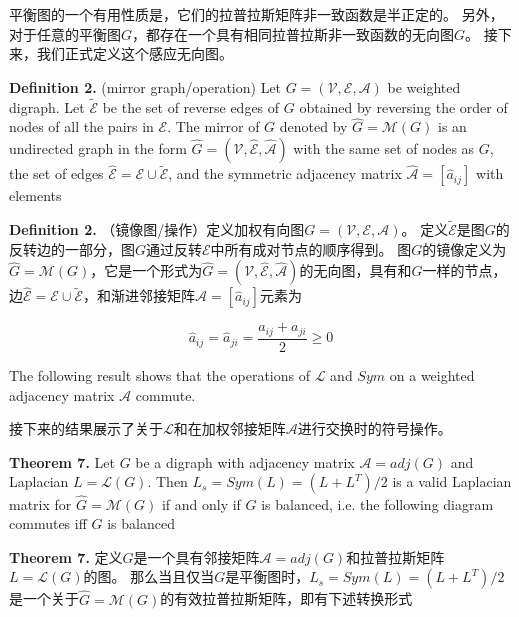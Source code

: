 \documentclass{article}
\begin{document}
平衡图的一个有用性质是，它们的拉普拉斯矩阵非一致函数是半正定的。
另外，对于任意的平衡图$G$，都存在一个具有相同拉普拉斯非一致函数的无向图$G$。
接下来，我们正式定义这个感应无向图。

{\color[gray]{0.5}
\noindent \textbf{Definition 2.} (mirror graph/operation) Let $G=(\mathcal{V}, \mathcal{E}, \mathcal{A})$ be weighted digraph. 
Let $\tilde{\mathcal{E}}$ be the set of reverse edges of $G$ obtained by reversing the order of nodes of all the pairs in $\mathcal{E}$. 
The mirror of $G$ denoted by $\hat{G}=\mathcal{M}(G)$ is an undirected graph in the form $\hat{G}=(\mathcal{V}, \hat{\mathcal{E}}, \hat{\mathcal{A}})$ with the same set of nodes as $G$, the set of edges $\hat{\mathcal{E}}=\mathcal{E}\cup \tilde{\mathcal{E}}$, and the symmetric adjacency matrix $\hat{\mathcal{A}}=[\hat{a}_{ij}]$ with elements
}

\noindent \textbf{Definition 2.} （镜像图/操作）定义加权有向图$G=(\mathcal{V}, \mathcal{E}, \mathcal{A})$。
定义$\tilde{\mathcal{E}}$是图$G$的反转边的一部分，图$G$通过反转$\mathcal{E}$中所有成对节点的顺序得到。
图$G$的镜像定义为$\hat{G}=\mathcal{M}(G)$，它是一个形式为$\hat{G}=(\mathcal{V}, \hat{\mathcal{E}}, \hat{\mathcal{A}})$的无向图，具有和$G$一样的节点，边$\hat{\mathcal{E}}=\mathcal{E}\cup \tilde{\mathcal{E}}$，和渐进邻接矩阵$\hat{\mathcal{A}}=[\hat{a}_{ij}]$元素为

\begin{equation}
    \hat{a}_{ij}=\hat{a}_{ji}=\frac{a_{ij}+a_{ji}}{2}\ge 0
    \tag{25}
    \label{25}
\end{equation}

{\color[gray]{0.5}
The following result shows that the operations of $\mathcal{L}$ and $Sym$ on a weighted adjacency matrix $\mathcal{A}$ commute.
}

接下来的结果展示了关于$\mathcal{L}$和在加权邻接矩阵$\mathcal{A}$进行交换时的符号操作。

{\color[gray]{0.5}
\noindent \textbf{Theorem 7.} Let $G$ be a digraph with adjacency matrix $\mathcal{A}=adj(G)$ and Laplacian $L=\mathcal{L}(G)$. 
Then $L_s = Sym(L) = (L+L^T)/2$ is a valid Laplacian matrix for $\hat{G}=\mathcal{M}(G)$ if and only if $G$ is balanced, i.e. the following diagram commutes iﬀ $G$ is balanced
}

\noindent \textbf{Theorem 7.} 定义$G$是一个具有邻接矩阵$\mathcal{A}=adj(G)$和拉普拉斯矩阵$L=\mathcal{L}(G)$的图。
那么当且仅当$G$是平衡图时，$L_s = Sym(L) = (L+L^T)/2$是一个关于$\hat{G}=\mathcal{M}(G)$的有效拉普拉斯矩阵，即有下述转换形式
\end{document}
